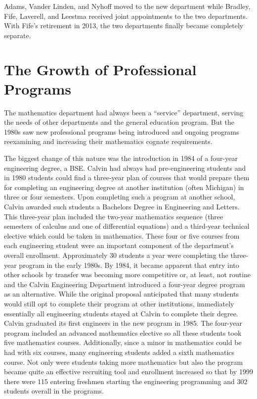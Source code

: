 \documentclass[
]{book}
\begin{document}
Adams, Vander Linden, and Nyhoff moved to the new department while Bradley, Fife, Laverell, and Leestma received joint appointments to the two departments. With Fife's retirement in 2013, the two departments finally became completely separate.

\hypertarget{the-growth-of-professional-programs}{%
\section{The Growth of Professional Programs}\label{the-growth-of-professional-programs}}

The mathematics department had always been a ``service'' department, serving the needs of other departments and the general education program. But the 1980s saw new professional programs being introduced and ongoing programs reexamining and increasing their mathematics cognate requirements.

The biggest change of this nature was the introduction in 1984 of a four-year engineering degree, a BSE. Calvin had always had pre-engineering students and in 1980 students could find a three-year plan of courses that would prepare them for completing an engineering degree at another institution (often Michigan) in three or four semesters. Upon completing such a program at another school, Calvin awarded such students a Bachelors Degree in Engineering and Letters. This three-year plan included the two-year mathematics sequence (three semesters of calculus and one of differential equations) and a third-year technical elective which could be taken in mathematics. These four or five courses from each engineering student were an important component of the department's overall enrollment. Approximately 30 students a year were completing the three-year program in the early 1980s. By 1984, it became apparent that entry into other schools by transfer was becoming more competitive or, at least, not routine and the Calvin Engineering Department introduced a four-year degree program as an alternative. While the original proposal anticipated that many students would still opt to complete their program at other institutions, immediately essentially all engineering students stayed at Calvin to complete their degree. Calvin graduated its first engineers in the new program in 1985. The four-year program included an advanced mathematics elective so all these students took five mathematics courses. Additionally, since a minor in mathematics could be had with six courses, many engineering students added a sixth mathematics course. Not only were students taking more mathematics but also the program became quite an effective recruiting tool and enrollment increased so that by 1999 there were 115 entering freshmen starting the engineering programming and 302 students overall in the programs.
\end{document}
